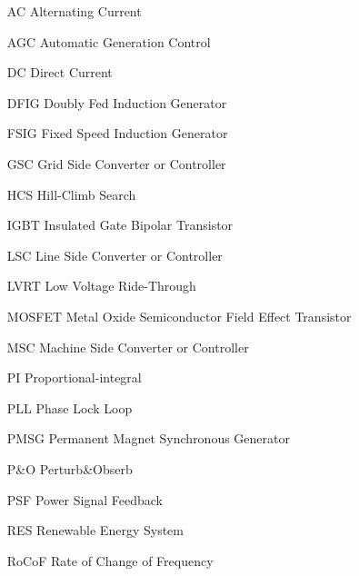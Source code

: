 \begin{glossary}{}

\begin{itemize}[leftmargin=4.5em,align=parleft,labelsep=1cm]
	
\item[AC] Alternating Current
\item[AGC] Automatic Generation Control
\item[DC] Direct Current
\item[DFIG] Doubly Fed Induction Generator
\item[FSIG] Fixed Speed Induction Generator
\item[GSC] Grid Side Converter or Controller
\item[HCS] Hill-Climb Search
\item[IGBT] Insulated Gate Bipolar Transistor
\item[LSC] Line Side Converter or Controller
\item[LVRT] Low Voltage Ride-Through
\item[MOSFET] Metal Oxide Semiconductor Field Effect Transistor
\item[MSC] Machine Side Converter or Controller
\item[PI] Proportional-integral
\item[PLL] Phase Lock Loop
\item[PMSG] Permanent Magnet Synchronous Generator
\item[P\&O] Perturb\&Obserb
\item[PSF] Power Signal Feedback
\item[RES] Renewable Energy System
\item[RoCoF] Rate of Change of Frequency

\end{itemize}

\end{glossary}
